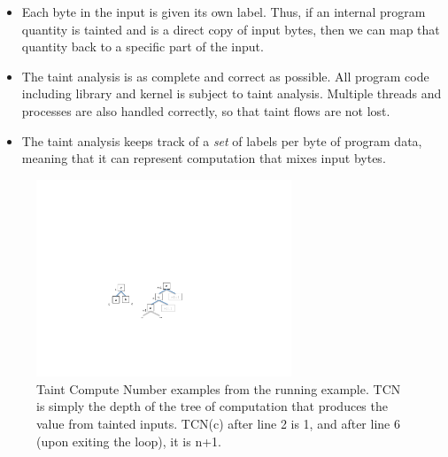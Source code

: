 \begin{itemize}
\item Each byte in the input is given its own label.
Thus, if an internal program quantity is tainted and is a direct copy of input bytes, then we can map that quantity back to a specific part of the input.
\item The taint analysis is as complete and correct as possible.  
All program code including library and kernel is subject to taint analysis.
Multiple threads and processes are also handled correctly, so that taint flows are not lost.
\item The taint analysis keeps track of a \emph{set} of labels per byte of program data, meaning that it can represent computation that mixes input bytes.
\end{itemize}

\begin{figure}
\centering
\includegraphics[width=3in]{tcn.pdf}
\caption{Taint Compute Number examples from the running example.  
TCN is simply the depth of the tree of computation that produces the value from tainted inputs.
TCN(c) after line 2 is 1, and after line 6 (upon exiting the loop), it is n+1.}
\label{fig:taint-compute-number}
\end{figure}

